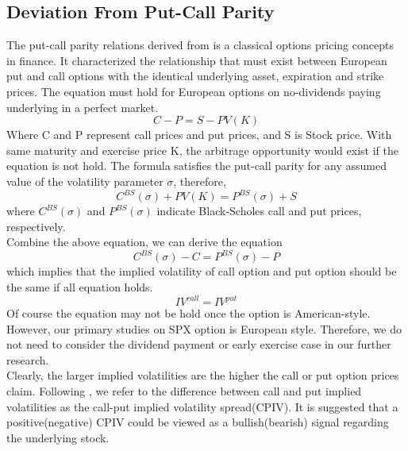 
\subsection{Deviation From Put-Call Parity}
The put-call parity relations derived from \textcite{stoll1969relationship} is a classical options pricing concepts in finance. It characterized the relationship that must exist between European put and call options with the identical underlying asset, expiration and strike prices. The equation must hold for European options on no-dividends paying underlying in a perfect market. 
\begin{equation}
C-P = S - PV(K)
\end{equation}
Where C and P represent call prices and put prices, and S is Stock price. With same maturity and exercise price K, the arbitrage opportunity would exist if the equation is not hold. The \textcite{black1973pricing} formula satisfies the put-call parity for any assumed value of the volatility parameter $\sigma$, therefore, 
\begin{equation}
C^{BS}(\sigma ) + PV(K) = P^{BS}(\sigma ) + S
\end{equation}
where $C^{BS}(\sigma )$ and $P^{BS}(\sigma )$ indicate Black-Scholes call and put prices, respectively. 
\\
Combine the above equation, we can derive the equation
\begin{equation}
C^{BS}(\sigma ) - C = P^{BS}(\sigma ) - P
\end{equation}
which implies that the implied volatility of call option and put option should be the same if all equation holds. 
\begin{equation}
IV^{call} = IV^{put}
\end{equation}
Of course the equation may not be hold once the option is American-style. However, our primary studies on SPX option is European style. Therefore, we do not need to consider the dividend payment or early exercise case in our further research. 
\\

Clearly, the larger implied volatilities are the higher the call or put option prices claim. Following \textcite{amin2004index}, we refer to the difference between call and put implied volatilities as the call-put implied volatility spread(CPIV). It is suggested that a positive(negative) CPIV could be viewed as a bullish(bearish) signal regarding the underlying stock. 
\\ 

